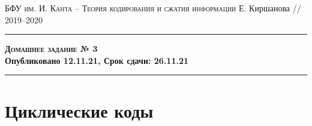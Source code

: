 \documentclass[11pt]{exam}
\theoremstyle{definition}
\begin{document}
	{\noindent
		\textsc{БФУ им. И. Канта -- Теория кодирования и сжатия информации}
		\hfill {Е. Киршанова // 2019--2020\\}
	\hrule
	\begin{center}
		{\Large\textbf{
				\textsc{Домашнее задание № 3} \\[5pt] {Опубликовано 12.11.21, Срок сдачи: 26.11.21}
		} } 
	\end{center}
	\hrule \vspace{5mm}
	
	\thispagestyle{empty}
	
	\vspace{0.2cm}
	\section{Циклические коды}
	
}
\end{document}
